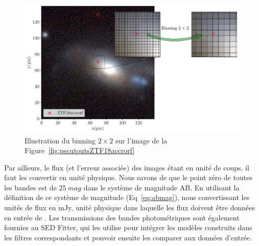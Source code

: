 \documentclass[../main/main.tex]{subfiles}
\begin{document}
\begin{figure}
  \centering
  \includegraphics[width=0.99\textwidth]{../figures/05_sedfit/ps_cutouts_ZTF18accrorf_binned.pdf}
  \caption[Illustration binning $2\times2$ sur les images
  PS1.]{Illustration du binning $2\times2$ sur l'image de la Figure~\ref{fig:pscutoutsZTF18accrorf}}
  \label{fig:pscutoutsZTF18accrorf_binned}
\end{figure}

Par ailleurs, le flux (et l'erreur associée) des images étant en unité
de coups, il faut les convertir en unité physique. Nous savons de
\citet{Tonry2012} que le point zéro de
toutes les bandes est de $\SI{25}{mag}$ dans le système de magnitude AB.
En utilisant la définition de ce système de magnitude (Eq~\ref{eq:abmag}), nous
convertissant les unités de flux en mJy, unité physique dans laquelle
les flux doivent être données en entrée de . Les
transmissions des bandes photométriques sont également fournies au SED
Fitter, qui les utilise pour intégrer les modèles construits dans les
filtres correspondants et pouvoir ensuite les comparer aux données d'entrée.

\end{document}
